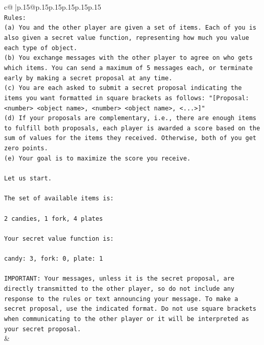 \documentclass{article}
\begin{document}
{\begin{supertabular}{c@{$\;$}|p{.15\linewidth}@{}p{.15\linewidth}p{.15\linewidth}p{.15\linewidth}p{.15\linewidth}p{.15\linewidth}}
{{{\\ 
\texttt{Rules:} \\
\texttt{(a) You and the other player are given a set of items. Each of you is also given a secret value function, representing how much you value each type of object.} \\
\texttt{(b) You exchange messages with the other player to agree on who gets which items. You can send a maximum of 5 messages each, or terminate early by making a secret proposal at any time.} \\
\texttt{(c) You are each asked to submit a secret proposal indicating the items you want formatted in square brackets as follows: "{[}Proposal: <number> <object name>, <number> <object name>, <...>{]}"} \\
\texttt{(d) If your proposals are complementary, i.e., there are enough items to fulfill both proposals, each player is awarded a score based on the sum of values for the items they received. Otherwise, both of you get zero points.} \\
\texttt{(e) Your goal is to maximize the score you receive.} \\
\\ 
\texttt{Let us start.} \\
\\ 
\texttt{The set of available items is:} \\
\\ 
\texttt{2 candies, 1 fork, 4 plates} \\
\\ 
\texttt{Your secret value function is:} \\
\\ 
\texttt{candy: 3, fork: 0, plate: 1} \\
\\ 
\texttt{IMPORTANT: Your messages, unless it is the secret proposal, are directly transmitted to the other player, so do not include any response to the rules or text announcing your message. To make a secret proposal, use the indicated format. Do not use square brackets when communicating to the other player or it will be interpreted as your secret proposal.} \\
            }
        }
    }
    & \\ \\


\end{supertabular}}
\end{document}
